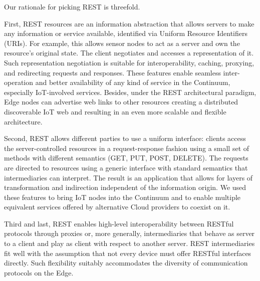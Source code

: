 Our rationale for picking REST is threefold.\par
First, REST resources are an information abstraction that allows servers to make any information or service available, identified via Uniform Resource Identifiers (URIs). For example, this allows sensor nodes to act as a server and own the resource's original state. The client negotiates and accesses a representation of it. Such representation negotiation is suitable for interoperability, caching, proxying, and redirecting requests and responses. These features enable seamless inter-operation and better availability of any kind of service in the Continuum, especially IoT-involved services. Besides, under the REST architectural paradigm, Edge nodes can advertise web links to other resources creating a distributed discoverable IoT web and resulting in an even more scalable and flexible architecture.\par
Second, REST allows different parties to use a uniform interface: clients access the server-controlled resources in a request-response fashion using a small set of methods with different semantics (GET, PUT, POST, DELETE). The requests are directed to resources using a generic interface with standard semantics that intermediaries can interpret. The result is an application that allows for layers of transformation and indirection independent of the information origin. We used these features to bring IoT nodes into the Continuum and to enable multiple equivalent services offered by alternative Cloud providers to coexist on it.\par
Third and last, REST enables high-level interoperability between RESTful protocols through proxies or, more generally, intermediaries that behave as server to a client and play as client with respect to another server. REST intermediaries fit well with the assumption that not every device must offer RESTful interfaces directly. Such flexibility suitably accommodates the diversity of communication protocols on the Edge.

